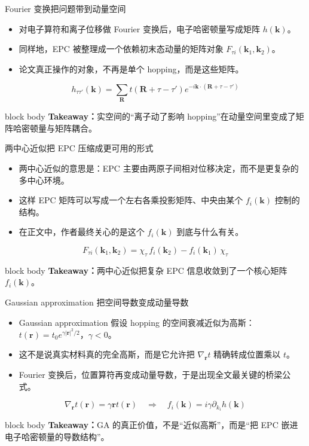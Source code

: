 \documentclass[aspectratio=169,11pt,UTF8]{ctexbeamer}
\newcommand{\takeaway}[1]{%
  \vfill
  \begin{beamercolorbox}[wd=\textwidth,sep=0.7ex,rounded=true]{block body}
    \small\textbf{Takeaway：}#1
  \end{beamercolorbox}
}
\begin{document}
\begin{frame}{Fourier 变换把问题带到动量空间}
  \begin{itemize}
    \item 对电子算符和离子位移做 Fourier 变换后，电子哈密顿量写成矩阵 $h(\mathbf{k})$。
    \item 同样地，EPC 被整理成一个依赖初末态动量的矩阵对象 $F_{\tau i}(\mathbf{k}_1,\mathbf{k}_2)$。
    \item 论文真正操作的对象，不再是单个 hopping，而是这些矩阵。
  \end{itemize}
  \begin{equation*}
    h_{\tau\tau'}(\mathbf{k})
    =
    \sum_{\mathbf{R}}
    t(\mathbf{R}+\tau-\tau')
    e^{-i\mathbf{k}\cdot(\mathbf{R}+\tau-\tau')}
  \end{equation*}
  \takeaway{实空间的“离子动了影响 hopping”在动量空间里变成了矩阵哈密顿量与矩阵耦合。}
\end{frame}

\begin{frame}{两中心近似把 EPC 压缩成更可用的形式}
  \begin{itemize}
    \item 两中心近似的意思是：EPC 主要由两原子间相对位移决定，而不是更复杂的多中心环境。
    \item 这样 EPC 矩阵可以写成一个左右各乘投影矩阵、中央由某个 $f_i(\mathbf{k})$ 控制的结构。
    \item 在正文中，作者最终关心的是这个 $f_i(\mathbf{k})$ 到底与什么有关。
  \end{itemize}
  \begin{equation*}
    F_{\tau i}(\mathbf{k}_1,\mathbf{k}_2)
    =
    \chi_{\tau} \, f_i(\mathbf{k}_2)
    -
    f_i(\mathbf{k}_1)\, \chi_{\tau}
  \end{equation*}
  \takeaway{两中心近似把复杂 EPC 信息收敛到了一个核心矩阵 $f_i(\mathbf{k})$。}
\end{frame}

\begin{frame}{Gaussian approximation 把空间导数变成动量导数}
  \begin{itemize}
    \item Gaussian approximation 假设 hopping 的空间衰减近似为高斯：
    $t(\mathbf{r})=t_0 e^{\gamma |\mathbf{r}|^2/2}$，$\gamma<0$。
    \item 这不是说真实材料真的完全高斯，而是它允许把 $\nabla_{\mathbf{r}} t$ 精确转成位置乘以 $t$。
    \item Fourier 变换后，位置算符再变成动量导数，于是出现全文最关键的桥梁公式。
  \end{itemize}
  \begin{equation*}
    \nabla_{\mathbf{r}} t(\mathbf{r}) = \gamma \mathbf{r} t(\mathbf{r})
    \quad \Longrightarrow \quad
    f_i(\mathbf{k}) = i\gamma \partial_{k_i} h(\mathbf{k})
  \end{equation*}
  \takeaway{GA 的真正价值，不是“近似高斯”，而是“把 EPC 嵌进电子哈密顿量的导数结构”。}
\end{frame}
\end{document}

